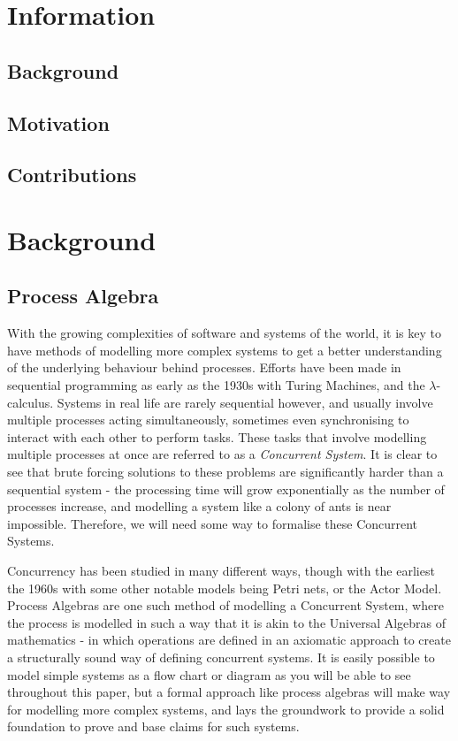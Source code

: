 \documentclass[logo,bsc,singlespacing,parskip,online]{infthesis}
\begin{document}
\chapter{Information}

\section{Background}

\section{Motivation}

\section{Contributions}

\newpage
\chapter{Background}

\section{Process Algebra}
With the growing complexities of software and systems of the world, it is key to have methods of modelling more complex systems to get a better understanding of the underlying behaviour behind processes. Efforts have been made in sequential programming as early as the 1930s with Turing Machines, and the $\lambda$-calculus. Systems in real life are rarely sequential however, and usually involve multiple processes acting simultaneously, sometimes even synchronising to interact with each other to perform tasks. These tasks that involve modelling multiple processes at once are referred to as a \textit{Concurrent System}. It is clear to see that brute forcing solutions to these problems are significantly harder than a sequential system - the processing time will grow exponentially as the number of processes increase, and modelling a system like a colony of ants is near impossible. Therefore, we will need some way to formalise these Concurrent Systems.

Concurrency has been studied in many different ways, though with the earliest  the 1960s with some other notable models being Petri nets, or the Actor Model. Process Algebras are one such method of modelling a Concurrent System, where the process is modelled in such a way that it is akin to the Universal Algebras of mathematics - in which operations are defined in an axiomatic approach to create a structurally sound way of defining concurrent systems. \citep{baeten_brief_2005} It is easily possible to model simple systems as a flow chart or diagram as you will be able to see throughout this paper, but a formal approach like process algebras will make way for modelling more complex systems, and lays the groundwork to provide a solid foundation to prove and base claims for such systems.
\end{document}
